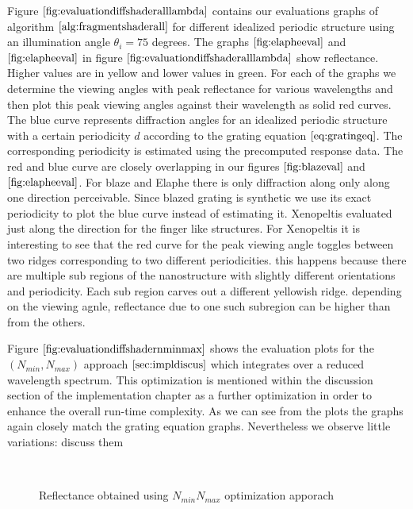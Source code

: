 Figure $\ref{fig:evaluationdiffshaderalllambda}$ contains our evaluations graphs of algorithm $\ref{alg:fragmentshaderall}$ for different idealized periodic structure using an illumination angle $\theta_i = 75$ degrees. The graphs $\ref{fig:elapheeval}$ and $\ref{fig:elapheeval}$ in figure $\ref{fig:evaluationdiffshaderalllambda}$ show reflectance. Higher values are in yellow and lower values in green. For each of the graphs we determine the viewing angles with peak reflectance for various wavelengths and then plot this peak viewing angles against their wavelength as solid red curves. The blue curve represents diffraction angles for an idealized periodic structure with a certain periodicity $d$ according to the grating equation $\ref{eq:gratingeq}$. The corresponding periodicity is estimated using the precomputed response data. The red and blue curve are closely overlapping in our figures $\ref{fig:blazeval}$ and $\ref{fig:elapheeval}$. For blaze and Elaphe there is only diffraction along only along one direction perceivable. Since blazed grating is synthetic we use its exact periodicity to plot the blue curve instead of estimating it. Xenopeltis evaluated just along the direction for the finger like structures. For Xenopeltis it is interesting to see that the red curve for the peak viewing angle toggles between two ridges corresponding to two different periodicities. this happens because there are multiple sub regions of the nanostructure with slightly different orientations and periodicity. Each sub region carves out a different yellowish ridge. depending on the viewing agnle, reflectance due to one such subregion can be higher than from the others.

Figure $\ref{fig:evaluationdiffshadernminmax}$ shows the evaluation plots for the $(N_{min},N_{max})$ approach $\ref{sec:impldiscus}$ which integrates over a reduced wavelength spectrum. This optimization is mentioned within the discussion section of the implementation chapter as a further optimization in order to enhance the overall run-time complexity. As we can see from the plots the graphs again closely match the grating equation graphs. Nevertheless we observe little variations: discuss them

\begin{figure}[H]
  \centering
~
\caption{Reflectance obtained using $N_{min} N_{max}$ optimization apporach}
\label{fig:evaluationdiffshadernminmax}
\end{figure}


